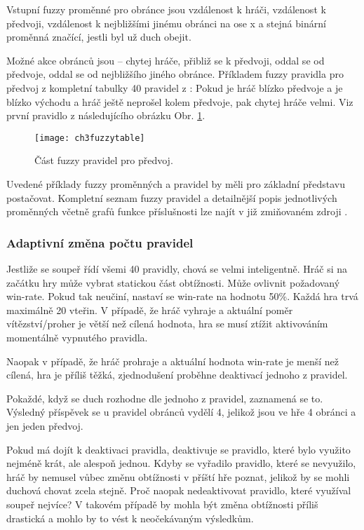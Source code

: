 Vstupní fuzzy proměnné pro obránce jsou vzdálenost k hráči, vzdálenost k předvoji, vzdálenost k nejbližšími jinému obránci na ose x a stejná binární proměnná značící, jestli byl už duch obejit.

Možné akce obránců jsou – chytej hráče, přibliž se k předvoji, oddal se od předvoje, oddal se od nejbližšího jiného obránce.
Příkladem fuzzy pravidla pro předvoj z kompletní tabulky 40 pravidel z \cite{25deadend} :
Pokud je hráč blízko předvoje a je blízko východu a hráč ještě neprošel kolem předvoje, pak chytej hráče velmi. Viz první pravidlo z následujícího obrázku Obr. \ref{fig-ch3fuzzytable}.

\begin{figure}
  \centering
  \texttt{[image: ch3fuzzytable]}
	\caption{Část fuzzy pravidel pro předvoj. \cite{25deadend} }
	\label{fig-ch3fuzzytable}
\end{figure}

Uvedené příklady fuzzy proměnných a pravidel by měli pro základní představu postačovat. Kompletní seznam fuzzy pravidel a detailnější popis jednotlivých proměnných včetně grafů funkce příslušnosti lze najít v již zmiňovaném zdroji \cite{25deadend}.

\subsubsection{Adaptivní změna počtu pravidel}

Jestliže se soupeř řídí všemi 40 pravidly, chová se velmi inteligentně. Hráč si na začátku hry může vybrat statickou část obtížnosti. Může ovlivnit požadovaný win-rate. Pokud tak neučiní, nastaví se win-rate na hodnotu 50\%. Každá hra trvá maximálně 20 vteřin. V případě, že hráč vyhraje a aktuální poměr vítězství/proher  je větší než cílená hodnota, hra se musí ztížit aktivováním momentálně vypnutého pravidla.

Naopak v případě, že hráč prohraje a aktuální hodnota win-rate je menší než cílená, hra je příliš těžká, zjednodušení proběhne deaktivací jednoho z pravidel.

Pokaždé, když se duch rozhodne dle jednoho z pravidel, zaznamená se to. Výsledný příspěvek se u pravidel obránců vydělí 4, jelikož jsou ve hře 4 obránci a jen jeden předvoj.

Pokud má dojít k deaktivaci pravidla, deaktivuje se pravidlo, které bylo využito nejméně krát, ale alespoň jednou. Kdyby se vyřadilo pravidlo, které se nevyužilo, hráč by nemusel vůbec změnu obtížnosti v příští hře poznat, jelikož by se mohli duchová chovat zcela stejně. Proč naopak nedeaktivovat pravidlo, které využíval soupeř nejvíce? V takovém případě by mohla být změna obtížnosti příliš drastická a mohlo by to vést k neočekávaným výsledkům.

